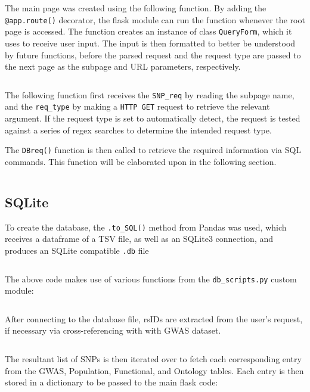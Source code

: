 \documentclass[12pt,a4paper]{article}
\newcommand{\mintfile}[1]{
\begin{tcolorbox}[colback=gray!5!white,%
	grow to left by=20mm,
    grow to right by=20mm,
    sharp corners]{{    \small \inputminted[breaklines]{python}{#1}		}}
\end{tcolorbox}}
\newcommand{\subsect}[1]{
\FloatBarrier %
\hypertarget{#1}{
\subsection{#1}\label{#1}}
}
\begin{document}
The main page was created using the following function. By adding the \verb|@app.route()| decorator,
the flask module can run the function whenever the root page is accessed.
The function creates an instance of class \texttt{QueryForm}, which it uses to receive user input.
The input is then formatted to better be understood by future functions,
before the parsed request and the request type are passed to the next page as the subpage and URL parameters, respectively.

\mintfile{code_snippets/flask/root.py}

The following function first receives the \texttt{SNP\_req} by reading the subpage name,
and the \texttt{req\_type} by making a \texttt{HTTP GET} request to retrieve the relevant argument.
If the request type is set to automatically detect, the request is tested against a series of
regex searches to determine the intended request type.

The \texttt{DBreq()} function is then called to retrieve the required information via SQL commands. This function will be elaborated upon in the following section.

\mintfile{code_snippets/flask/snp.py}

\subsect{SQLite}

To create the database, the \texttt{.to\_SQL()} method from Pandas was used, which receives a dataframe of a TSV file,
as well as an SQLite3 connection, and produces an SQLite compatible \texttt{.db} file

\mintfile{code_snippets/SQL/create_db.py}
The above code makes use of various functions from the \texttt{db\_scripts.py} custom module:

\mintfile{code_snippets/SQL/pdDB.py}

After connecting to the database file, rsIDs are extracted from the user's request,
if necessary via cross-referencing with with GWAS dataset.

\mintfile{code_snippets/SQL/DBreq1.py}

The resultant list of SNPs is then iterated over to fetch each corresponding entry from the
GWAS, Population, Functional, and Ontology tables.
Each entry is then stored in a dictionary to be passed to the main flask code:

\FloatBarrier

\mintfile{code_snippets/SQL/DBreq2.py}
\FloatBarrier
\end{document}
